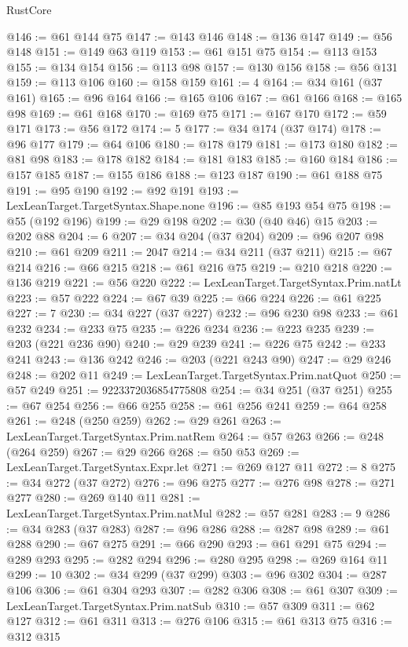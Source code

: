 \begin{lexlean}{RustCore}
\begin{coremodule}
@146 := @61 @144 @75
@147 := @143 @146
@148 := @136 @147
@149 := @56 @148
@151 := @149 @63 @119
@153 := @61 @151 @75
@154 := @113 @153
@155 := @134 @154
@156 := @113 @98
@157 := @130 @156
@158 := @56 @131
@159 := @113 @106
@160 := @158 @159
@161 := 4
@164 := @34 @161 (@37 @161)
@165 := @96 @164
@166 := @165 @106
@167 := @61 @166
@168 := @165 @98
@169 := @61 @168
@170 := @169 @75
@171 := @167 @170
@172 := @59 @171
@173 := @56 @172
@174 := 5
@177 := @34 @174 (@37 @174)
@178 := @96 @177
@179 := @64 @106
@180 := @178 @179
@181 := @173 @180
@182 := @81 @98
@183 := @178 @182
@184 := @181 @183
@185 := @160 @184
@186 := @157 @185
@187 := @155 @186
@188 := @123 @187
@190 := @61 @188 @75
@191 := @95 @190
@192 := @92 @191
@193 := LexLeanTarget.TargetSyntax.Shape.none
@196 := @85 @193 @54 @75
@198 := @55 (@192 @196)
@199 := @29 @198
@202 := @30 (@40 @46) @15
@203 := @202 @88
@204 := 6
@207 := @34 @204 (@37 @204)
@209 := @96 @207 @98
@210 := @61 @209
@211 := 2047
@214 := @34 @211 (@37 @211)
@215 := @67 @214
@216 := @66 @215
@218 := @61 @216 @75
@219 := @210 @218
@220 := @136 @219
@221 := @56 @220
@222 := LexLeanTarget.TargetSyntax.Prim.natLt
@223 := @57 @222
@224 := @67 @39
@225 := @66 @224
@226 := @61 @225
@227 := 7
@230 := @34 @227 (@37 @227)
@232 := @96 @230 @98
@233 := @61 @232
@234 := @233 @75
@235 := @226 @234
@236 := @223 @235
@239 := @203 (@221 @236 @90)
@240 := @29 @239
@241 := @226 @75
@242 := @233 @241
@243 := @136 @242
@246 := @203 (@221 @243 @90)
@247 := @29 @246
@248 := @202 @11
@249 := LexLeanTarget.TargetSyntax.Prim.natQuot
@250 := @57 @249
@251 := 9223372036854775808
@254 := @34 @251 (@37 @251)
@255 := @67 @254
@256 := @66 @255
@258 := @61 @256 @241
@259 := @64 @258
@261 := @248 (@250 @259)
@262 := @29 @261
@263 := LexLeanTarget.TargetSyntax.Prim.natRem
@264 := @57 @263
@266 := @248 (@264 @259)
@267 := @29 @266
@268 := @50 @53
@269 := LexLeanTarget.TargetSyntax.Expr.let
@271 := @269 @127 @11
@272 := 8
@275 := @34 @272 (@37 @272)
@276 := @96 @275
@277 := @276 @98
@278 := @271 @277
@280 := @269 @140 @11
@281 := LexLeanTarget.TargetSyntax.Prim.natMul
@282 := @57 @281
@283 := 9
@286 := @34 @283 (@37 @283)
@287 := @96 @286
@288 := @287 @98
@289 := @61 @288
@290 := @67 @275
@291 := @66 @290
@293 := @61 @291 @75
@294 := @289 @293
@295 := @282 @294
@296 := @280 @295
@298 := @269 @164 @11
@299 := 10
@302 := @34 @299 (@37 @299)
@303 := @96 @302
@304 := @287 @106
@306 := @61 @304 @293
@307 := @282 @306
@308 := @61 @307
@309 := LexLeanTarget.TargetSyntax.Prim.natSub
@310 := @57 @309
@311 := @62 @127
@312 := @61 @311
@313 := @276 @106
@315 := @61 @313 @75
@316 := @312 @315

\end{coremodule}
\end{lexlean}
